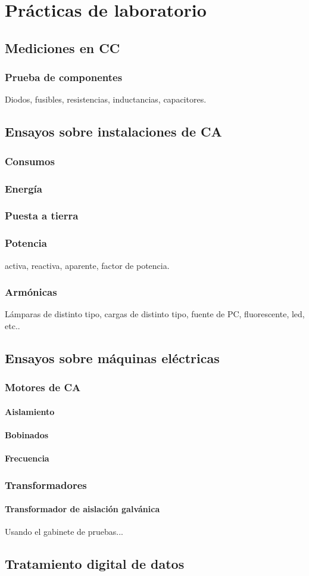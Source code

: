 \chapter{Prácticas de laboratorio}

\section{Mediciones en CC}
\subsection{Prueba de componentes}
Diodos, fusibles, resistencias, inductancias, capacitores.
\section{Ensayos sobre instalaciones de CA}
\subsection{Consumos}
\subsection{Energía}
\subsection{Puesta a tierra}
\subsection{Potencia}
activa, reactiva, aparente, factor de potencia.
\subsection{Armónicas}
Lámparas de distinto tipo, cargas de distinto tipo, fuente de PC, fluorescente, led, etc..

\section{Ensayos sobre máquinas eléctricas}
\subsection{Motores de CA}
\subsubsection{Aislamiento}
\subsubsection{Bobinados}
\subsubsection{Frecuencia}
\subsection{Transformadores}
	\subsubsection{Transformador de aislación galvánica}
	Usando el gabinete de pruebas...
\section{Tratamiento digital de datos}